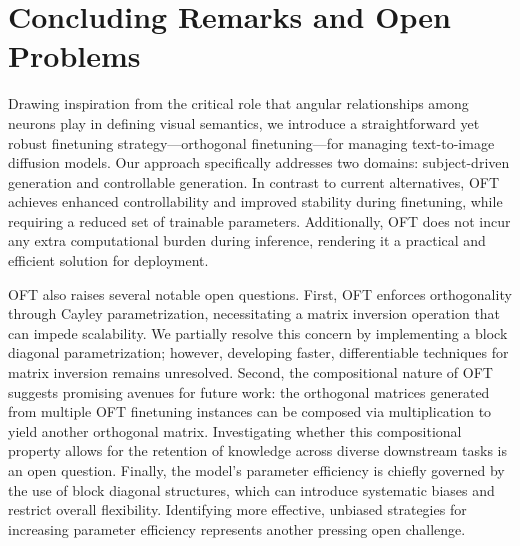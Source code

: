 \section{Concluding Remarks and Open Problems}

Drawing inspiration from the critical role that angular relationships among neurons play in defining visual semantics, we introduce a straightforward yet robust finetuning strategy—orthogonal finetuning—for managing text-to-image diffusion models. Our approach specifically addresses two domains: subject-driven generation and controllable generation. In contrast to current alternatives, OFT achieves enhanced controllability and improved stability during finetuning, while requiring a reduced set of trainable parameters. Additionally, OFT does not incur any extra computational burden during inference, rendering it a practical and efficient solution for deployment.

OFT also raises several notable open questions. First, OFT enforces orthogonality through Cayley parametrization, necessitating a matrix inversion operation that can impede scalability. We partially resolve this concern by implementing a block diagonal parametrization; however, developing faster, differentiable techniques for matrix inversion remains unresolved. Second, the compositional nature of OFT suggests promising avenues for future work: the orthogonal matrices generated from multiple OFT finetuning instances can be composed via multiplication to yield another orthogonal matrix. Investigating whether this compositional property allows for the retention of knowledge across diverse downstream tasks is an open question. Finally, the model’s parameter efficiency is chiefly governed by the use of block diagonal structures, which can introduce systematic biases and restrict overall flexibility. Identifying more effective, unbiased strategies for increasing parameter efficiency represents another pressing open challenge.

